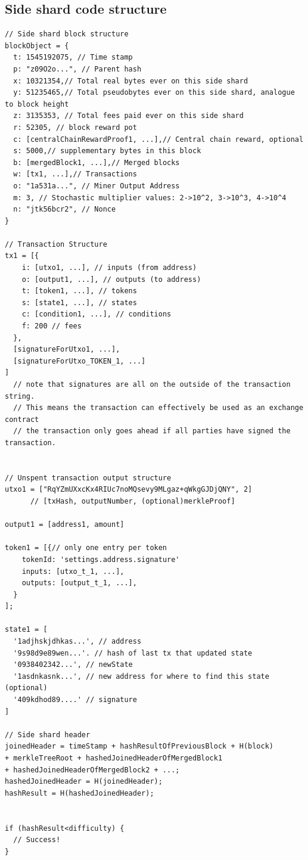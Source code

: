 \documentclass[a4paper,12pt]{article}
\begin{document}
\subsection{Side shard code structure}
\begin{lstlisting}
// Side shard block structure
blockObject = {
  t: 1545192075, // Time stamp
  p: "z09O2o...", // Parent hash
  x: 10321354,// Total real bytes ever on this side shard
  y: 51235465,// Total pseudobytes ever on this side shard, analogue to block height
  z: 3135353, // Total fees paid ever on this side shard
  r: 52305, // block reward pot
  c: [centralChainRewardProof1, ...],// Central chain reward, optional
  s: 5000,// supplementary bytes in this block
  b: [mergedBlock1, ...],// Merged blocks
  w: [tx1, ...],// Transactions
  o: "1a531a...", // Miner Output Address
  m: 3, // Stochastic multiplier values: 2->10^2, 3->10^3, 4->10^4
  n: "jtk56bcr2", // Nonce
}

// Transaction Structure
tx1 = [{
    i: [utxo1, ...], // inputs (from address)
    o: [output1, ...], // outputs (to address)
    t: [token1, ...], // tokens
    s: [state1, ...], // states
    c: [condition1, ...], // conditions
    f: 200 // fees
  },
  [signatureForUtxo1, ...], 
  [signatureForUtxo_TOKEN_1, ...]
]
  // note that signatures are all on the outside of the transaction string. 
  // This means the transaction can effectively be used as an exchange contract
  // the transaction only goes ahead if all parties have signed the transaction. 


// Unspent transaction output structure
utxo1 = ["RqYZmUXxcKx4RIUc7noMQsevy9MLgaz+qWkgGJDjQNY", 2]
      // [txHash, outputNumber, (optional)merkleProof] 

output1 = [address1, amount]

token1 = [{// only one entry per token
    tokenId: 'settings.address.signature'
    inputs: [utxo_t_1, ...],
    outputs: [output_t_1, ...],
  }
];

state1 = [ 
  '1adjhskjdhkas...', // address
  '9s98d9e89wen...'. // hash of last tx that updated state
  '0938402342...', // newState
  '1asdnkasnk...', // new address for where to find this state (optional)
  '409kdhod89....' // signature
]

// Side shard header
joinedHeader = timeStamp + hashResultOfPreviousBlock + H(block)
+ merkleTreeRoot + hashedJoinedHeaderOfMergedBlock1
+ hashedJoinedHeaderOfMergedBlock2 + ...;
hashedJoinedHeader = H(joinedHeader);
hashResult = H(hashedJoinedHeader);


if (hashResult<difficulty) {
  // Success!
}

\end{lstlisting}
\end{document}
